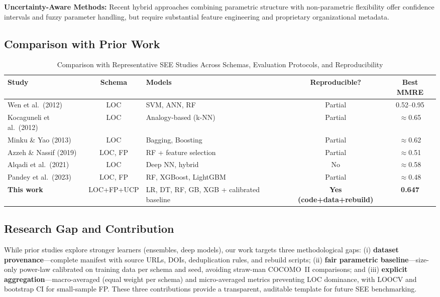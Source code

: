 \documentclass[11pt,a4paper]{article}
\begin{document}
\textbf{Uncertainty-Aware Methods:} Recent hybrid approaches combining parametric structure with non-parametric flexibility offer confidence intervals and fuzzy parameter handling, but require substantial feature engineering and proprietary organizational metadata.

\subsection{Comparison with Prior Work}

\begin{table}[h]
\centering
\caption{Comparison with Representative SEE Studies Across Schemas, Evaluation Protocols, and Reproducibility}
\label{tab:related-compare}
\footnotesize
\begin{tabular}{|p{2.8cm}|c|p{2.5cm}|c|c|}
\hline
\textbf{Study} & \textbf{Schema} & \textbf{Models} & \textbf{Reproducible?} & \textbf{Best MMRE} \\
\hline
Wen et al.\ (2012) & LOC & SVM, ANN, RF & Partial & 0.52--0.95 \\
Kocaguneli et al.\ (2012) & LOC & Analogy-based (k-NN) & Partial & $\approx$0.65 \\
Minku \& Yao (2013) & LOC & Bagging, Boosting & Partial & $\approx$0.62 \\
Azzeh \& Nassif (2019) & LOC, FP & RF + feature selection & Partial & $\approx$0.51 \\
Alqadi et al.\ (2021) & LOC & Deep NN, hybrid & No & $\approx$0.58 \\
Pandey et al.\ (2023) & LOC, FP & RF, XGBoost, LightGBM & Partial & $\approx$0.48 \\
\hline
\textbf{This work} & LOC+FP+UCP & LR, DT, RF, GB, XGB + calibrated baseline & \textbf{Yes (code+data+rebuild)} & \textbf{0.647} \\
\hline
\end{tabular}
\end{table}

\subsection{Research Gap and Contribution}

While prior studies explore stronger learners (ensembles, deep models), our work targets three methodological gaps: (i) \textbf{dataset provenance}---complete manifest with source URLs, DOIs, deduplication rules, and rebuild scripts; (ii) \textbf{fair parametric baseline}---size-only power-law calibrated on training data per schema and seed, avoiding straw-man COCOMO~II comparisons; and (iii) \textbf{explicit aggregation}---macro-averaged (equal weight per schema) and micro-averaged metrics preventing LOC dominance, with LOOCV and bootstrap CI for small-sample FP. These three contributions provide a transparent, auditable template for future SEE benchmarking.
\end{document}
